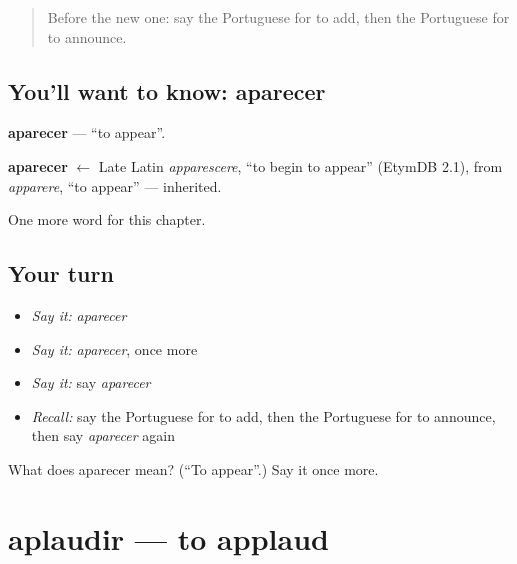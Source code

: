 \label{lesson:PT-C141-aparecer}



\begin{quote}
Before the new one: say the Portuguese for to add, then the Portuguese for to announce.
\end{quote}

\subsection*{You'll want to know: aparecer}
\textbf{aparecer} — \textquotedblleft{}to appear\textquotedblright{}.

\begin{cousinweb}
\textbf{aparecer} $\leftarrow$ Late Latin \emph{apparescere}, \textquotedblleft{}to begin to appear\textquotedblright{} (EtymDB 2.1), from \emph{apparere}, \textquotedblleft{}to appear\textquotedblright{} — inherited.
\end{cousinweb}

\begin{grammarlens}[title={What you've built}]
One more word for this chapter.
\end{grammarlens}

\subsection*{Your turn}
\begin{itemize}
\raggedright
  \item \emph{Say it:} \emph{aparecer}
  \item \emph{Say it:} \emph{aparecer}, once more
  \item \emph{Say it:} say \emph{aparecer}
  \item \emph{Recall:} say the Portuguese for to add, then the Portuguese for to announce, then say \emph{aparecer} again
\end{itemize}

\begin{tcolorbox}[breakable,colback=teal!4,colframe=teal!35!black,title={Before you move on}]
What does aparecer mean? (\textquotedblleft{}To appear\textquotedblright{}.) Say it once more.
\end{tcolorbox}
\section[aplaudir]{aplaudir — to applaud}

\label{lesson:PT-C141-aplaudir}



